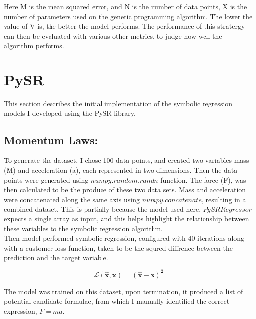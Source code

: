\documentclass{article}
\begin{document}
Here M is the mean squared error, and N is the number of data points, X is the number of parameters used on the genetic programming algorithm. The lower the value of V is, the better the model performs. The performance of this stratergy can then be evaluated with various other metrics, to judge how well the algorithm performs. \\ 





\section{PySR}

This section describes the initial implementation of the symbolic regression models I developed using the PySR library.\\

\subsection{Momentum Laws: }

To generate the dataset, I chose 100 data points, and created two variables mass (M) and acceleration (a), each represented in two dimensions\cite{cranmer2023}. Then the data points were generated using $numpy.random.randn$ function. The force (F), was then calculated to be the produce of these two data sets. Mass and acceleration were concatenated along the same axis using $numpy.concatenate$, resulting in a combined dataset. This is partially because the model used here, $PySRRegressor$ expects a single array as input, and this helps highlight the relationship between these variables to the symbolic regression algorithm.\\ 

Then model performed symbolic regression, configured with 40 iterations along with a customer loss function, taken to be the squred diffrence between the prediction and the target variable. \\ 

\begin{center}
  
  $$
  {\boldsymbol{\mathcal{L}(\hat{x}, x) = (\hat{x} - x)^2}}
$$

\end{center}


The model was trained on this dataset, upon termination, it produced a list of potential candidate formulae, from which I manually identified the correct expression, $F = m \dot a$. \\
\end{document}
